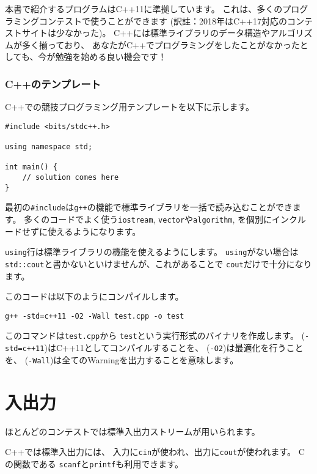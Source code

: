 本書で紹介するプログラムはC++11に準拠しています。
これは、多くのプログラミングコンテストで使うことができます
(訳註：2018年はC++17対応のコンテストサイトは少なかった)。
C++には標準ライブラリのデータ構造やアルゴリズムが多く揃っており、
あなたがC++でプログラミングをしたことがなかったとしても、今が勉強を始める良い機会です！

\subsubsection{C++のテンプレート}

C++での競技プログラミング用テンプレートを以下に示します。

\begin{lstlisting}
#include <bits/stdc++.h>

using namespace std;

int main() {
    // solution comes here
}
\end{lstlisting}

最初の\texttt{\#include}は\texttt{g++}の機能で標準ライブラリを一括で読み込むことができます。
多くのコードでよく使う\texttt{iostream},
\texttt{vector}や\texttt{algorithm},
を個別にインクルードせずに使えるようになります。

\texttt{using}行は標準ライブラリの機能を使えるようにします。
\texttt{using}がない場合は
\texttt{std::cout}と書かないといけませんが、これがあることで
\texttt{cout}だけで十分になります。

このコードは以下のようにコンパイルします。

\begin{lstlisting}
g++ -std=c++11 -O2 -Wall test.cpp -o test
\end{lstlisting}

このコマンドは\texttt{test.cpp}から
\texttt{test}という実行形式のバイナリを作成します。
(\texttt{-std=c++11})はC++11としてコンパイルすることを、
(\texttt{-O2})は最適化を行うことを、
(\texttt{-Wall})は全てのWarningを出力することを意味します。

\section{入出力}


ほとんどのコンテストでは標準入出力ストリームが用いられます。

C++では標準入出力には、
入力に\texttt{cin}が使われ、出力に\texttt{cout}が使われます。
Cの関数である
\texttt{scanf}と\texttt{printf}も利用できます。

